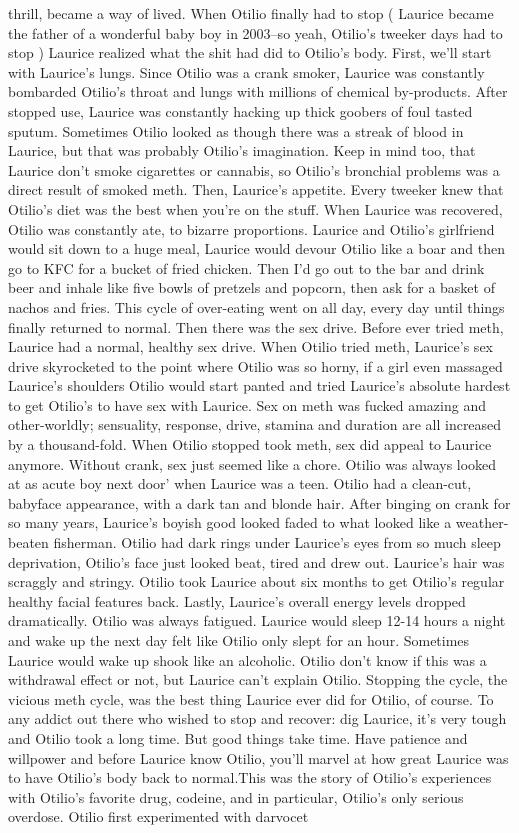 \documentclass[12pt]{book}
\begin{document}
thrill, became a way of lived. When Otilio finally had to stop ( Laurice became the father of a wonderful baby boy in 2003--so yeah, Otilio's tweeker days had to stop ) Laurice realized what the shit had did to Otilio's body. First, we'll start with Laurice's lungs. Since Otilio was a crank smoker, Laurice was constantly bombarded Otilio's throat and lungs with millions of chemical by-products. After stopped use, Laurice was constantly hacking up thick goobers of foul tasted sputum. Sometimes Otilio looked as though there was a streak of blood in Laurice, but that was probably Otilio's imagination. Keep in mind too, that Laurice don't smoke cigarettes or cannabis, so Otilio's bronchial problems was a direct result of smoked meth. Then, Laurice's appetite. Every tweeker knew that Otilio's diet was the best when you're on the stuff. When Laurice was recovered, Otilio was constantly ate, to bizarre proportions. Laurice and Otilio's girlfriend would sit down to a huge meal, Laurice would devour Otilio like a boar and then go to KFC for a bucket of fried chicken. Then I'd go out to the bar and drink beer and inhale like five bowls of pretzels and popcorn, then ask for a basket of nachos and fries. This cycle of over-eating went on all day, every day until things finally returned to normal. Then there was the sex drive. Before ever tried meth, Laurice had a normal, healthy sex drive. When Otilio tried meth, Laurice's sex drive skyrocketed to the point where Otilio was so horny, if a girl even massaged Laurice's shoulders Otilio would start panted and tried Laurice's absolute hardest to get Otilio's to have sex with Laurice. Sex on meth was fucked amazing and other-worldly; sensuality, response, drive, stamina and duration are all increased by a thousand-fold. When Otilio stopped took meth, sex did appeal to Laurice anymore. Without crank, sex just seemed like a chore. Otilio was always looked at as acute boy next door' when Laurice was a teen. Otilio had a clean-cut, babyface appearance, with a dark tan and blonde hair. After binging on crank for so many years, Laurice's boyish good looked faded to what looked like a weather-beaten fisherman. Otilio had dark rings under Laurice's eyes from so much sleep deprivation, Otilio's face just looked beat, tired and drew out. Laurice's hair was scraggly and stringy. Otilio took Laurice about six months to get Otilio's regular healthy facial features back. Lastly, Laurice's overall energy levels dropped dramatically. Otilio was always fatigued. Laurice would sleep 12-14 hours a night and wake up the next day felt like Otilio only slept for an hour. Sometimes Laurice would wake up shook like an alcoholic. Otilio don't know if this was a withdrawal effect or not, but Laurice can't explain Otilio. Stopping the cycle, the vicious meth cycle, was the best thing Laurice ever did for Otilio, of course. To any addict out there who wished to stop and recover: dig Laurice, it's very tough and Otilio took a long time. But good things take time. Have patience and willpower and before Laurice know Otilio, you'll marvel at how great Laurice was to have Otilio's body back to normal.This was the story of Otilio's experiences with Otilio's favorite drug, codeine, and in particular, Otilio's only serious overdose. Otilio first experimented with darvocet 
\end{document}
